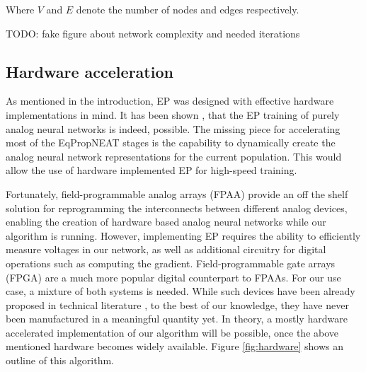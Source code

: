 \documentclass[lettersize,journal]{IEEEtran}
\newcommand{\eqprop}{EP }
\begin{document}
		Where $V$ and $E$ denote the number of nodes and edges respectively. 
		
		TODO: fake figure about network complexity and needed iterations
		
		\subsection{Hardware acceleration}
		As mentioned in the introduction, \eqprop was designed with effective hardware implementations in mind. It has been shown \cite{hardware_eq}, that the \eqprop training of purely analog neural networks is indeed, possible. The missing piece for accelerating most of the EqPropNEAT stages is the capability to dynamically create the analog neural network representations for the current population. This would allow the use of hardware implemented \eqprop for high-speed training. 
		
		Fortunately, field-programmable analog arrays (FPAA) provide an off the shelf solution for reprogramming the interconnects between different analog devices, enabling the creation of hardware based analog neural networks while our algorithm is running. However, implementing \eqprop requires the ability to efficiently measure voltages in our network, as well as additional circuitry for digital operations such as computing the gradient. Field-programmable gate arrays (FPGA) are a much more popular digital counterpart to FPAAs. For our use case, a mixture of both systems is needed. While such devices have been already proposed in technical literature \cite{fgbfpmsa}, to the best of our knowledge, they have never been manufactured in a meaningful quantity yet. In theory, a mostly hardware accelerated implementation of our algorithm will be possible, once the above mentioned hardware becomes widely available. Figure \ref{fig:hardware} shows an outline of this algorithm. 
		
\end{document}
